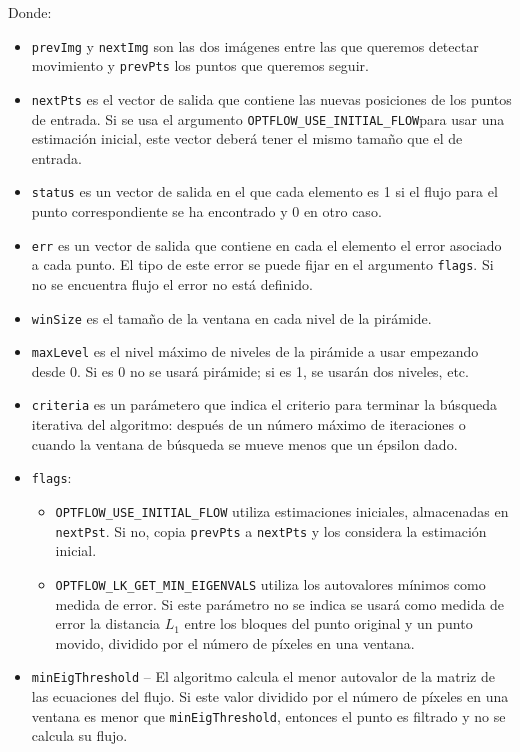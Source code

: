 \documentclass[a4paper,openright, 12pt]{book}
\begin{document}
Donde:
\begin{itemize}
\item \lstinline|prevImg| y \lstinline|nextImg| son las dos imágenes entre las que queremos detectar movimiento y \lstinline|prevPts| los puntos que queremos seguir.
\item \lstinline|nextPts| es el vector de salida que contiene las nuevas posiciones de los puntos de entrada. Si se usa el argumento \lstinline|OPTFLOW_USE_INITIAL_FLOW|para usar una estimación inicial, este vector deberá tener el mismo tamaño que el de entrada.

\item \lstinline|status| es un vector de salida en el que cada elemento es 1 si el flujo para el punto correspondiente se ha encontrado y 0 en otro caso.

\item \lstinline|err| es un vector de salida que contiene en cada el elemento el error asociado a cada punto. El tipo de este error se puede fijar en el argumento \lstinline|flags|.  Si no se encuentra flujo el error no está definido.

\item \lstinline|winSize| es el tamaño de la ventana en cada nivel de la pirámide.


\item \lstinline|maxLevel| es el nivel máximo de niveles  de la pirámide a usar empezando desde 0. Si es 0 no se usará pirámide; si es 1, se usarán dos niveles, etc. 

\item \lstinline|criteria| es un parámetero que indica el criterio para terminar la búsqueda iterativa del algoritmo: después de un número máximo de iteraciones
o cuando la ventana de búsqueda se mueve menos que un épsilon dado.
\item \lstinline|flags|:
        \begin{itemize}
    \item \lstinline|OPTFLOW_USE_INITIAL_FLOW| utiliza estimaciones iniciales, almacenadas en \lstinline|nextPst|. Si no, copia \lstinline|prevPts| a \lstinline|nextPts| y los considera la estimación inicial.
    
    \item \lstinline|OPTFLOW_LK_GET_MIN_EIGENVALS| utiliza los autovalores mínimos como medida de error. Si este parámetro no se indica se usará como medida de error la distancia $L_1$ entre los bloques del punto original y un punto movido, dividido por el número de píxeles en una ventana.
        \end{itemize}
\item \lstinline|minEigThreshold| –  El algoritmo calcula el menor autovalor de la matriz de las ecuaciones del flujo. Si este valor dividido por el número de píxeles en una ventana es menor que \lstinline|minEigThreshold|, entonces el punto es filtrado y no se calcula su flujo.

\end{itemize}
\newpage
\end{document}
